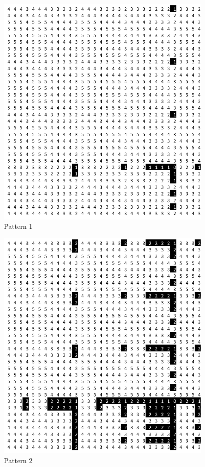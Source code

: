 \documentclass[oneside,12pt]{DISCSthesis}
\begin{document}
{\begin{figure}[h]
			\begin{minipage}{.135\textwidth}\centering\includegraphics[width=0.95\textwidth]{img/1}\\ Pattern 1 \end{minipage}
			\begin{minipage}{.135\textwidth}\centering\includegraphics[width=0.95\textwidth]{img/2}\\ Pattern 2 \end{minipage}

\end{figure}}
\end{document}
